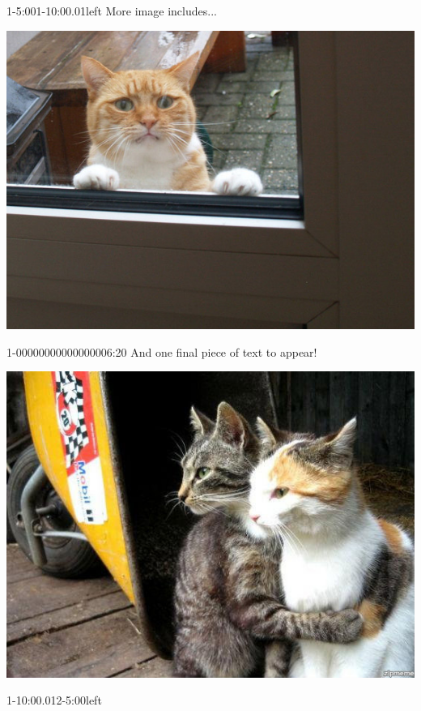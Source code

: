 \begin{vsvframe}{1-5:00}{1-10:00.01}{left}
More image includes...

\begin{enumerate}
\includegraphics[scale=0.1]{img/0004.jpg}
\end{enumerate}

\begin{vsvappear}{1-00000000000000006:20}{}
And one final piece of text to appear!

\includegraphics[scale=0.1]{img/0005.jpg}
\end{vsvappear}

\end{vsvframe}

\begin{vsvframe}{1-10:00.01}{2-5:00}{left}



\end{vsvframe}


